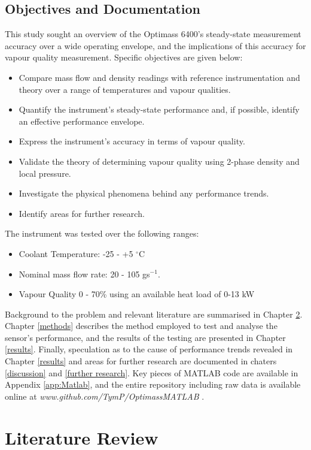 \documentclass{report}
\begin{document}
\section{Objectives and Documentation}
\FloatBarrier
This study sought an overview of the Optimass 6400's steady-state measurement accuracy over a wide operating envelope, and the implications of this accuracy for vapour quality measurement. Specific objectives are given below:
\begin{itemize}
\item{Compare mass flow and density readings with reference instrumentation and theory over a range of temperatures and vapour qualities.}
\item{Quantify the instrument's steady-state performance and, if possible, identify an effective performance envelope.}
\item{Express the instrument's accuracy in terms of vapour quality.}
\item{Validate the theory of determining vapour quality using 2-phase density and local pressure.}
\item{Investigate the physical phenomena behind any performance trends.}
\item{Identify areas for further research.}
\end{itemize}
The instrument was tested over the following ranges:
\begin{itemize}
\item{Coolant Temperature: -25 - +5 $^\circ$C}
\item{Nominal mass flow rate: 20 - 105 gs$^{-1}$.}
\item{Vapour Quality 0 - 70\% using an available heat load of 0-13 kW}
\end{itemize}
Background to the problem and relevant literature are summarised in Chapter \ref{litReview}. Chapter \ref{methods} describes the method employed to test and analyse the sensor's performance, and the results of the testing are presented in Chapter \ref{results}. Finally, speculation as to the cause of performance trends revealed in Chapter \ref{results} and areas for further research are documented in chaters \ref{discussion} and \ref{further research}. Key pieces of MATLAB code are available in Appendix \ref{app:Matlab}, and the entire repository including raw data is available online at \textit{www.github.com/TymP/OptimassMATLAB} .


\chapter{Literature Review} \label{litReview}
\FloatBarrier
\vspace{-1cm}
\end{document}
